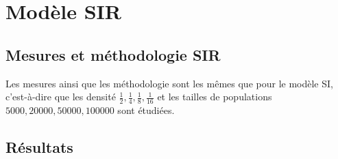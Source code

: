 \chapter{Modèle SIR} \label{ch:SIR}

\section{Mesures et méthodologie SIR}

Les mesures ainsi que les méthodologie sont les mêmes que pour le modèle SI, c'est-à-dire que les densité $\frac{1}{2},\frac{1}{4},\frac{1}{8},\frac{1}{16}$ et les tailles de populations $5000,20000,50000,100000$ sont étudiées.

\section{Résultats}

